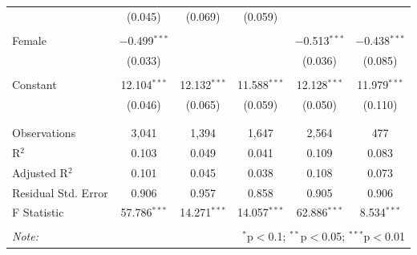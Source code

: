 \documentclass[12pt,a4paper]{article}
\begin{document}
\begin{table}[!htbp]
\begin{tabular}{@{\extracolsep{5pt}}lccccc}
  & (0.045) & (0.069) & (0.059) &  &  \\ 
  & & & & & \\ 
 Female & $-$0.499$^{***}$ &  &  & $-$0.513$^{***}$ & $-$0.438$^{***}$ \\ 
  & (0.033) &  &  & (0.036) & (0.085) \\ 
  & & & & & \\ 
 Constant & 12.104$^{***}$ & 12.132$^{***}$ & 11.588$^{***}$ & 12.128$^{***}$ & 11.979$^{***}$ \\ 
  & (0.046) & (0.065) & (0.059) & (0.050) & (0.110) \\ 
  & & & & & \\ 
\hline \\[-1.8ex] 
Observations & 3,041 & 1,394 & 1,647 & 2,564 & 477 \\ 
R$^{2}$ & 0.103 & 0.049 & 0.041 & 0.109 & 0.083 \\ 
Adjusted R$^{2}$ & 0.101 & 0.045 & 0.038 & 0.108 & 0.073 \\ 
Residual Std. Error & 0.906 & 0.957 & 0.858 & 0.905 & 0.906 \\ 
F Statistic & 57.786$^{***}$ & 14.271$^{***}$ & 14.057$^{***}$ & 62.886$^{***}$ & 8.534$^{***}$ \\ 
\hline 
\hline \\[-1.8ex] 
\textit{Note:}  & \multicolumn{5}{r}{$^{*}$p$<$0.1; $^{**}$p$<$0.05; $^{***}$p$<$0.01} \\ 
\end{tabular} 
\end{table} 

\newpage
\end{document}
